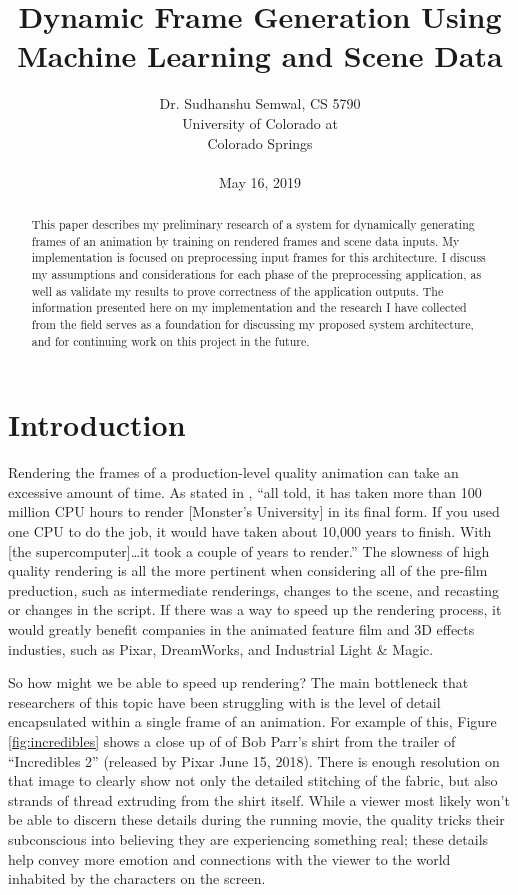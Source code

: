 \documentclass[conference]{IEEEtran}
\begin{document}
\title{Dynamic Frame Generation Using Machine Learning
and Scene Data
}

\author{
Dr. Sudhanshu Semwal, CS 5790\\
University of Colorado at\\
Colorado Springs\\\\
May 16, 2019}

\maketitle

\begin{abstract}
This paper describes my preliminary research of a
system for dynamically generating frames
of an animation by training on rendered frames and scene data inputs. My
implementation is focused on preprocessing input frames for this architecture.
I discuss my assumptions and considerations for each phase of the preprocessing
application, as well as validate my results to prove correctness of the
application outputs.
The information presented here on my implementation and the research I
have collected from the field serves as a foundation for discussing my proposed
system architecture, and for continuing work on this
project in the future.
\end{abstract}

\section{Introduction}
\label{sec:introduction}
Rendering the frames of a production-level quality animation can take an
excessive amount of time. As stated in \cite{ref:monsters}, ``all told, it has
taken more than 100 million CPU hours to render [Monster's University] in its final form. If
you used one CPU to do the job, it would have taken about 10,000 years to
finish. With [the supercomputer]\dots it took a couple of years to
render.'' The slowness of high quality rendering is all the more pertinent when considering all of the
pre-film preduction, such as intermediate renderings, changes to the scene, and
recasting or changes in the script. If there was a way to speed up the rendering
process, it would greatly benefit companies in the animated feature film and 3D
effects industies, such as Pixar, DreamWorks,
and Industrial Light \& Magic.

So how might we be able to speed up rendering? The main bottleneck that
researchers of this topic have been struggling with is the level of detail
encapsulated within a single frame of an animation. For example of this, Figure
\ref{fig:incredibles} shows a close up of of Bob Parr's shirt from the trailer
of ``Incredibles 2'' (released by Pixar June 15, 2018). There is enough
resolution on that image to clearly show not only the detailed stitching of the
fabric, but also strands of thread extruding from the shirt itself. While a
viewer most likely won't be able to discern these details during the running
movie, the quality tricks their subconscious into believing they are
experiencing something real; these details help convey more emotion and
connections with the viewer to the world inhabited by the characters on the screen.
\end{document}
